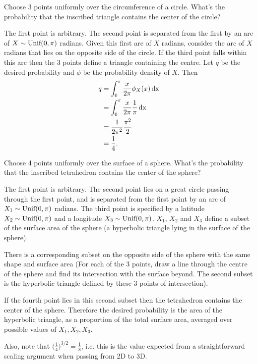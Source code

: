 \documentclass[12pt]{article}
\begin{document}
\begin{mdframed}
  Choose 3 points uniformly over the circumference of a circle. What's the
  probability that the inscribed triangle contains the center of the circle?
\end{mdframed}

The first point is arbitrary. The second point is separated from the first by
an arc of $X \sim \text{Unif}(0, \pi)$ radians. Given this first arc of $X$ radians,
consider the arc of $X$ radians that lies on the opposite side of the
circle. If the third point falls within this arc then the 3 points define a
triangle containing the centre. Let $q$ be the desired probability and $\phi$
be the probability density of $X$. Then
\begin{align*}
  q &= \int_0^{\pi} \frac{x}{2\pi}\phi_X(x) \operatorname{\text{dx}}\\
    &= \int_0^{\pi} \frac{x}{2\pi}\frac{1}{\pi} \operatorname{\text{dx}}\\
    &= \frac{1}{2\pi^2} \frac{\pi^2}{2}\\
    &= \frac{1}{4}.
\end{align*}


\begin{mdframed}
  Choose 4 points uniformly over the surface of a sphere. What's the
  probability that the inscribed tetrahedron contains the center of the sphere?
\end{mdframed}

The first point is arbitrary. The second point lies on a great circle passing
through the first point, and is separated from the first point by an arc of
$X_1 \sim \text{Unif}(0, \pi)$ radians. The third point is specified by a latitude
$X_2 \sim \text{Unif}(0, \pi)$ and a longitude $X_3 \sim \text{Unif}(0, \pi)$.  $X_1$,
$X_2$ and $X_3$ define a subset of the surface area of the sphere (a hyperbolic
triangle lying in the surface of the sphere).

There is a corresponding subset on the opposite side of the sphere with the
same shape and surface area (For each of the 3 points, draw a line through the
centre of the sphere and find its intersection with the surface beyond. The
second subset is the hyperbolic triangle defined by these 3 points of
intersection).

If the fourth point lies in this second subset then the tetrahedron contains
the center of the sphere. Therefore the desired probability is the area of the
hyperbolic triangle, as a proportion of the total surface area, averaged over
possible values of $X_1, X_2, X_3$.

Also, note that $\Big(\frac{1}{4}\Big)^{3/2} = \frac{1}{8}$, i.e. this is the
value expected from a straightforward scaling argument when passing from 2D to
3D.
\end{document}
